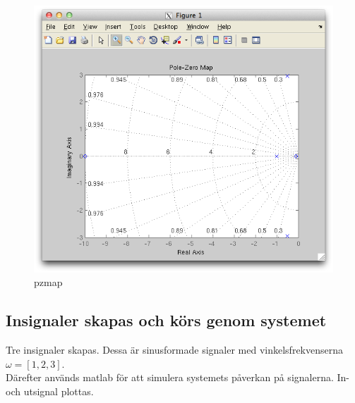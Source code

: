 \documentclass[]{article}
\begin{document}
\begin{figure}[htb]
  \centering
  \includegraphics[width=15.0cm]{pzmap.png}
  \caption{pzmap}
\end{figure}

\subsection{Insignaler skapas och körs genom systemet} %
\label{sub:insignal}

Tre insignaler skapas. Dessa är sinusformade signaler med vinkelsfrekvenserna $\omega = [1,2,3]$. \\
Därefter används matlab för att simulera systemets påverkan på signalerna. In- och utsignal plottas.
\end{document}
